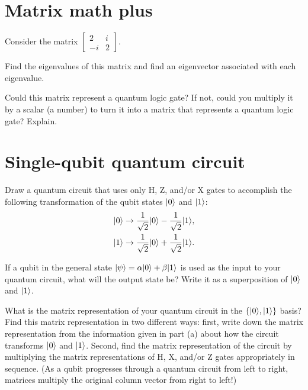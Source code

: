 \documentclass{../phys084}
\author{}
\date{January 29, 2020}
\begin{document}
\section{Matrix math plus}
\begin{exercise}
  Consider the matrix
  \(\begin{bmatrix} 2 & i \\ -i & 2 \end{bmatrix}\).
  \begin{problems}
  \item Find the eigenvalues of this matrix and find an eigenvector
    associated with each eigenvalue.
  \item Could this matrix represent a quantum logic gate?  If not,
    could you multiply it by a scalar (a number) to turn it into a
    matrix that represents a quantum logic gate?  Explain.
  \end{problems}
\end{exercise}

\begin{solution}
\end{solution}

\section{Single-qubit quantum circuit}
\begin{exercise}
  \begin{problems}
  \item Draw a quantum circuit that uses only H, Z, and/or X gates to
    accomplish the following transformation of the qubit states
    \(\lvert0\rangle\) and \(\lvert1\rangle\):
    \begin{align}
      \lvert0\rangle &\to \frac{1}{\sqrt 2} \lvert0\rangle - \frac{1}{\sqrt 2} \lvert1\rangle, \\
      \lvert1\rangle &\to \frac{1}{\sqrt 2} \lvert0\rangle + \frac{1}{\sqrt 2} \lvert1\rangle.
    \end{align}
  \item If a qubit in the general state
    \(\lvert\psi\rangle = \alpha \lvert0\rangle + \beta \lvert1\rangle\) is used as the input
    to your quantum circuit, what will the output state be?  Write it
    as a superposition of \(\lvert0\rangle\) and \(\lvert1\rangle\).
  \item What is the matrix representation of your quantum circuit in
    the \(\{\lvert0\rangle, \lvert1\rangle\}\) basis?  Find this matrix
    representation in two different ways: first, write down the matrix
    representation from the information given in part (a) about how
    the circuit transforms \(\lvert0\rangle\) and \(\lvert1\rangle\).  Second, find
    the matrix representation of the circuit by multiplying the matrix
    representations of H, X, and/or Z gates appropriately in sequence.
    (As a qubit progresses through a quantum circuit from left to
    right, matrices multiply the original column vector from right to
    left!)
  \end{problems}
\end{exercise}
\end{document}
